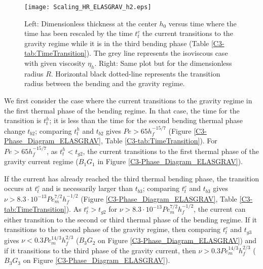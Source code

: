 \begin{figure}[h!]
  \begin{center}
    \graphicspath{ {/Users/thorey/Documents/These/Projet/Refroidissement/Skin_Model/Figure/JFM_V13/} }
    \texttt{[image: Scaling\_HR\_ELASGRAV\_h2.eps]}
    \caption{Left: Dimensionless thickness at  the center $h_0$ versus
      time where  the time has been  rescaled by the time  $t_t^c$ the
      current transitions  to the  gravity regime while  it is  in the
      third  bending phase  (Table \ref{C3-tab:TimeTransition}).   The
      grey line  represents the  isoviscous case with  given viscosity
      $\eta_h$.   Right: Same  plot but  for the  dimensionless radius
      $R$.   Horizontal black  dotted-line  represents the  transition
      radius between the bending and the gravity regime.}
    \label{C3-Scaling_HR_ELASGRAV_h2}
  \end{center}
\end{figure}

We  first consider  the  case  where the  current  transitions to  the
gravity regime  in the first thermal  phase of the bending  regime. In
that case, the time for the transition is $t_t^h$; it is less than the
time for the  second bending thermal phase  change $t_{b2}$; comparing
$t_t^h$    and   $t_{b2}$    gives    $Pe>65   h_f^{-15/7}$    (Figure
\ref{C3-Phase_Diagram_ELASGRAV},  Table  \ref{C3-tab:TimeTransition}).
For $Pe>65 h_f^{-15/7}$, as $t_t^h<t_{g2}$, the current transitions to
the first  thermal phase  of the gravity  current regime  ($B_1G_1$ in
Figure \ref{C3-Phase_Diagram_ELASGRAV}).

If the  current has already  reached the third thermal  bending phase,
the  transition  occurs at  $t_t^c$  and  is necessarily  larger  than
$t_{b3}$;      comparing      $t_t^c$     and      $t_{b3}$      gives
$\nu   >   8.3   \cdot   10^{-13}   Pe_m^{7/2}   h_f^{-1/2}$   (Figure
\ref{C3-Phase_Diagram_ELASGRAV},  Table  \ref{C3-tab:TimeTransition}).
As $t_t^c>t_{g2}$ for $\nu > 8.3\cdot 10^{-13} Pe_m^{7/2} h_f^{-1/2}$,
the current can either transition to the second or third thermal phase
of the bending  regime.  If it transitions to the  second phase of the
gravity   regime,   then   comparing  $t_t^c$   and   $t_{g3}$   gives
$\nu    <    0.3Pe_m^{14/3}    h_f^{2/3}$    ($B_3G_2$    on    Figure
\ref{C3-Phase_Diagram_ELASGRAV}) and  if it  transitions to  the third
phase of  the gravity current,  then $\nu >  0.3Pe_m^{14/3} h_f^{2/3}$
($B_3G_3$ on Figure \ref{C3-Phase_Diagram_ELASGRAV}).

